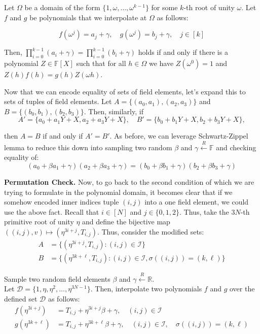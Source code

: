 \documentclass[../lecture-notes-148x210.tex]{subfiles}
\begin{document}
Let $\Omega$ be a domain of the form \(\{1, \omega, \dots, \omega^{k-1}\}\) for
some $k$-th root of unity $\omega$. Let $f$ and $g$ be polynomials that we
interpolate at $\Omega$ as follows:

\begin{equation*}
    f(\omega^j) = a_j + \gamma, \quad g(\omega^j) = b_j + \gamma, \quad j \in [k]
\end{equation*}

Then, \(\prod_{i=0}^{k-1} (a_i + \gamma) = \prod_{i=0}^{k-1} (b_i + \gamma)\) holds if and only if there is a polynomial $Z \in \mathbb{F}[X]$ such that for all $h \in \Omega$ we have $Z(\omega^{0}) = 1$ and $Z(h)f(h) = g(h)Z(\omega h)$.

Now that we can encode equality of sets of field elements, let's expand this to sets of tuples of field elements. Let \(A = \{(a_0, a_1), (a_2, a_3)\}\) and \(B = \{(b_0, b_1), (b_2, b_3)\}\). Then, similarly, if
\[A' = \{a_0 + a_1Y + X, a_2 + a_3Y + X\}, \quad B' = \{b_0 + b_1Y + X, b_2 + b_3Y + X\},\]

then $A=B$ if and only if $A'=B'$. As before, we can leverage Schwartz-Zippel lemma to reduce this down into sampling two random $\beta$ and $\gamma \xleftarrow{R} \mathbb{F}$ and checking equality of:
\begin{equation*}
    (a_0 + \beta a_1 + \gamma)(a_2 + \beta a_3 + \gamma) = (b_0 + \beta b_1 + \gamma)(b_2 + \beta b_3 + \gamma)
\end{equation*}

\textbf{Permutation Check.} Now, to go back to the second condition of
 which we are trying to formulate in the polynomial
domain, it becomes clear that if we somehow encoded inner indices tuple $(i, j)$
into a one field element, we could use the above fact. Recall that $i \in [N]$
and $j \in \{0,1,2\}$. Thus, take the $3N$-th primitive root of unity $\eta$ and
define the bijective map $((i,j),v) \mapsto (\eta^{3i+j}, T_{i,j})$. Thus,
consider the modified sets:
\begin{align*}
    A &= \{(\eta^{3i+j}, T_{i,j}) : (i, j) \in \mathcal{I}\} \\
    B &= \{(\eta^{3k+\ell}, T_{i,j}) : (i, j) \in \mathcal{I}, \sigma((i, j)) = (k, \ell)\}
\end{align*}

Sample two random field elements $\beta$ and $\gamma \xleftarrow{R} \mathbb{R}$. \\
Let $\mathcal{D} = \{1, \eta, \eta^2, \ldots, \eta^{3N-1}\}$. Then, interpolate two 
polynomials $f$ and $g$ over the defined set $\mathcal{D}$ as follows:
\begin{align*}
    f(\eta^{3i+j}) &= T_{i,j} + \eta^{3i+j}\beta + \gamma, \quad (i, j) \in \mathcal{I} \\
    g(\eta^{3k+\ell}) &= T_{i,j} + \eta^{3k+\ell}\beta + \gamma, \quad (i, j) \in \mathcal{I}, \quad \sigma((i, j)) = (k, \ell)
\end{align*}
\end{document}
